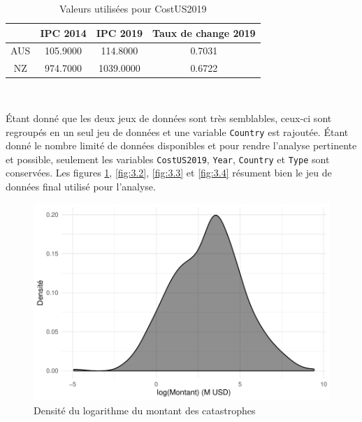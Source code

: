 \begin{table}[ht]
\centering
\begin{tabular}{cccc}
  \hline
 & IPC 2014 & IPC 2019 & Taux de change 2019 \\ 
  \hline
AUS & 105.9000 & 114.8000 & 0.7031 \\ 
  NZ & 974.7000 & 1039.0000 & 0.6722 \\ 
   \hline
\end{tabular}
\caption{Valeurs utilisées pour CostUS2019} 
\label{tab:3.5}
\end{table}\

Étant donné que les deux jeux de données sont très semblables, ceux-ci sont regroupés en un seul jeu de données et une variable \texttt{Country} est rajoutée. Étant donné le nombre limité de données disponibles et pour rendre l'analyse pertinente et possible, seulement les variables \texttt{CostUS2019}, \texttt{Year}, \texttt{Country} et \texttt{Type} sont conservées. Les figures \ref{fig:3.1}, \ref{fig:3.2}, \ref{fig:3.3} et \ref{fig:3.4} résument bien le jeu de données final utilisé pour l'analyse.


\begin{figure}
\begin{center}
\includegraphics{images/fig-plot1}
\end{center}
\caption{Densité du logarithme du montant des catastrophes}
\label{fig:3.1}
\end{figure}


